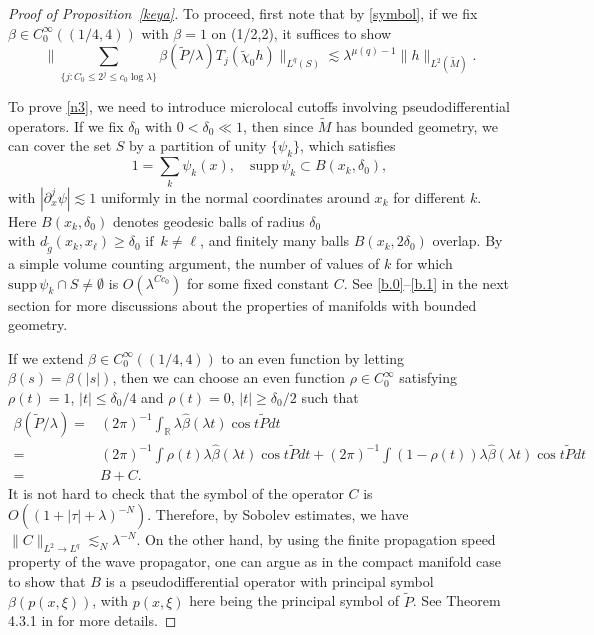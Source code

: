 \documentclass[10pt]{amsart}
\newcommand{\la}{\lambda}
\newcommand{\supp}{\mathrm{supp }}
\newcommand{\1}{{\bf 1}}
\newcommand{\R}{{\mathbb R}}
\begin{document}
\begin{proof}[Proof of Proposition~\ref{keya}]
To proceed, first note that by \eqref{symbol},
if we fix $\beta \in C^\infty_0((1/4,4))$ with $\beta= 1$ on (1/2,2), it suffices to show 
\begin{equation}\label{n3}
    \|\sum_{\{j:C_0\le 2^j\le c_0\log\la\}}\beta({\tilde{P}}/\la) T_j(\tilde \chi_0 h)\|_{L^q(S)}\lesssim 
    \la^{\mu(q)-1}\|h\|_{L^2(\tilde M)}.
\end{equation}


To prove \eqref{n3}, we need to introduce microlocal cutoffs involving pseudodifferential operators. If we fix {$\delta_0$} with $0<{\delta_0}\ll 1$, 
then since $\tilde M$ has bounded geometry, we can cover the set $S$ by a partition of unity $\{\psi_k\}$, which satisfies
\begin{equation}\label{n4}
1=\sum_k \psi_k(x), \quad \supp\,  \psi_k\subset B(x_k,{\delta_0}),
\end{equation}
with $|\partial_x^j \psi|\lesssim 1$ uniformly in the normal coordinates around $x_k$ for different $k$.  Here  $B(x_k,{\delta_0})$ denotes geodesic balls of radius {$\delta_0$} $\text{with } 
d_{\tilde g}(x_k,x_\ell)\ge {\delta_0} \, \, \text{if } \, k\ne \ell$,
and finitely many
 balls $B(x_k,2{\delta_0})$ overlap.  By a simple volume counting argument, the number of values of $k$ for which $\supp \, \psi_k\cap S\neq \emptyset$ is $O(\la^{Cc_0})$ for some fixed constant $C$. See \eqref{b.0}–\eqref{b.1} in the next section for more  discussions about the properties of manifolds with bounded geometry.

If we extend $\beta\in C_0^\infty ((1/4, 4))$ to an even function by letting $\beta(s)=\beta(|s|)$, then we can choose an even function $\rho\in C_0^\infty$   satisfying $\rho(t)= 1$, $|t|\le \delta_0/4$ and $\rho(t)=0 $, $|t|\ge \delta_0/2$ such that
\begin{equation}\label{n5'}
\begin{aligned}
     \beta(\tilde P/\la)=&(2\pi)^{-1}\int_\R\la\hat \beta(\la t)\cos t\tilde P dt \\
     =&(2\pi)^{-1}\int\rho(t)\la\hat \beta(\la t)\cos t\tilde P dt+ (2\pi)^{-1}\int (1-\rho(t)) \la\hat \beta(\la t)\cos t\tilde P dt\\
     =& B+C.
\end{aligned}
\end{equation}
  It is not hard to check that the symbol of the operator $C$ is $O((1+|\tau|+\la)^{-N})$. Therefore, by Sobolev estimates, we have $ \|C\|_{L^2\to L^q}\lesssim_N \la^{-N}$.
On the other hand, by  using the finite propagation speed property of the wave propagator, one can argue as in the compact manifold case to show that $B$ is a pseudodifferential operator with principal symbol $\beta(p(x,\xi))$,
with $p(x,\xi)$ here being the principal symbol of $\tilde P$. 
See Theorem 4.3.1 in \cite{SFIO2} for more details.


\end{proof}
\end{document}
